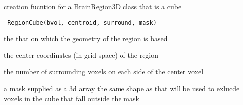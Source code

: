 \begin{Description}\relax
creation fucntion for a BrainRegion3D class that is a cube.
\end{Description}
\begin{Usage}
\begin{verbatim} RegionCube(bvol, centroid, surround, mask) \end{verbatim}
\end{Usage}
\begin{Arguments}
\begin{ldescription}
\item[\code{bvol}] the  that on which the geometry of the region is based 
\item[\code{centroid}] the center coordinates (in grid space) of the region 
\item[\code{surround}] the number of surrounding voxels on each side of the center voxel 
\item[\code{mask}] a mask supplied as a 3d array the same shape as  that will be used to exlucde voxels in the cube that fall outside the mask
\end{ldescription}
\end{Arguments}

